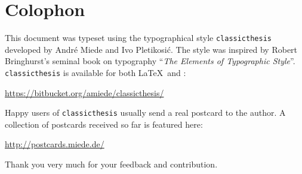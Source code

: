 \pagestyle{empty}

\hfill

\vfill


\section*{Colophon}
This document was typeset using the typographical style \texttt{classicthesis} developed by Andr\'e Miede and Ivo Pletikosić.
The style was inspired by Robert Bringhurst's seminal book on typography ``\emph{The Elements of Typographic Style}''.
\texttt{classicthesis} is available for both \LaTeX\ and \mLyX:
\begin{center}
\url{https://bitbucket.org/amiede/classicthesis/}
\end{center}
Happy users of \texttt{classicthesis} usually send a real postcard to the author. A collection of postcards received so far is featured here:
\begin{center}
\url{http://postcards.miede.de/}
\end{center}
Thank you very much for your feedback and contribution.

\bigskip

\noindent\finalVersionString


%
%
